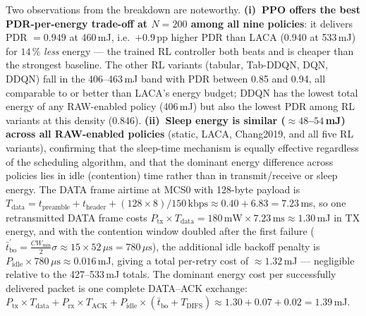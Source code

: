 \documentclass[conference]{IEEEtran}
\begin{document}
Two observations from the breakdown are noteworthy.
\textbf{(i)~PPO offers the best PDR-per-energy trade-off at $N=200$ among
all nine policies}: it delivers PDR $=0.949$ at 460\,mJ, i.e.\ $+0.9$\,pp
higher PDR than LACA (0.940 at 533\,mJ) for $14\,\%$ \emph{less} energy —
the trained RL controller both beats and is cheaper than the strongest
baseline.
The other RL variants (tabular, Tab-DDQN, DQN, DDQN) fall in the
406--463\,mJ band with PDR between 0.85 and 0.94, all comparable to or
better than LACA's energy budget; DDQN has the lowest total energy of any
RAW-enabled policy (406\,mJ) but also the lowest PDR among RL variants at
this density (0.846).
\textbf{(ii)~Sleep energy is similar ($\approx48$–$54$\,mJ) across all
RAW-enabled policies} (static, LACA, Chang2019, and all five RL variants),
confirming that the sleep-time mechanism is equally effective regardless
of the scheduling algorithm, and that the dominant energy difference across
policies lies in idle (contention) time rather than in transmit/receive or
sleep energy.
The DATA frame airtime at MCS0 with 128-byte payload is
$T_\text{data}=t_\text{preamble}+t_\text{header}+(128\!\times\!8)/150\,\text{kbps}
\approx 0.40+6.83=7.23$\,ms,
so one retransmitted DATA frame costs
$P_\text{tx}\!\times\!T_\text{data}=180\,\text{mW}\!\times\!7.23\,\text{ms}
\approx 1.30$\,mJ in TX energy, and with the contention window doubled
after the first failure
($\bar{t}_\text{bo}^{\prime}=\tfrac{CW_\text{min}}{2}\sigma
\approx 15\!\times\!52\,\mu\text{s}=780\,\mu\text{s}$),
the additional idle backoff penalty is
$P_\text{idle}\!\times\!780\,\mu\text{s}\approx0.016$\,mJ,
giving a total per-retry cost of $\approx1.32$\,mJ — negligible relative to
the 427--533\,mJ totals.
The dominant energy cost per successfully delivered packet is one complete
DATA–ACK exchange:
$P_\text{tx}\!\times\!T_\text{data} + P_\text{rx}\!\times\!T_\text{ACK}
+ P_\text{idle}\!\times\!(\bar{t}_\text{bo}+T_\text{DIFS})
\approx 1.30+0.07+0.02=1.39$\,mJ.
\end{document}
